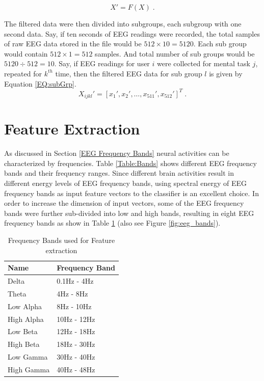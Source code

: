     \begin{equation}
		\label{EQ:bpf}
        X' = F(X) \;.
	\end{equation}
    
    The filtered data were then divided into subgroups, each subgroup with one second data. Say, if ten seconds of EEG readings were recorded, the total samples of raw EEG data stored in the file would be $512\times 10=5120$. Each sub group would contain $512\times1=512$ samples. And total number of sub groups would be $5120\div512=10$. Say, if EEG readings for user $i$ were collected for mental task $j$, repeated for $k^{th}$ time, then the filtered EEG data for sub group $l$ is given by Equation \ref{EQ:subGrp}.
    \begin{equation}
		\label{EQ:subGrp}
        X_{ijkl}' = [x_1', x_2', \ldots ,x_{511}', x_{512}']^T \;.
	\end{equation}
    
\section{Feature Extraction}
\label{FeatureExtraction}
	As discussed in Section \ref{EEG Frequency Bands} neural activities can be characterized by frequencies. Table \ref{Table:Bands} shows different EEG frequency bands and their frequency ranges. Since different brain activities result in different energy levels of EEG frequency bands, using spectral energy of EEG frequency bands as input feature vectors to the classifier is an excellent choice. In order to increase the dimension of input vectors, some of the EEG frequency bands were further sub-divided into low and high bands, resulting in eight EEG frequency bands as show in Table \ref{Table:Bands_more} (also see Figure \ref{fig:eeg_bands}).
    
    	\begin{table}[h!]
		\centering
		\caption{Frequency Bands used for Feature extraction}
		\label{Table:Bands_more}
		\begin{tabular}{l l}
			\hline
			Name &Frequency Band\\\hline
			Delta&0.1Hz - 4Hz\\
			Theta&4Hz - 8Hz\\
            Low Alpha&8Hz - 10Hz\\
			High Alpha&10Hz - 12Hz\\
            Low Beta&12Hz - 18Hz\\
			High Beta&18Hz - 30Hz\\
            Low Gamma&30Hz - 40Hz\\
			High Gamma&40Hz - 48Hz\\
		\end{tabular}
	\end{table}


